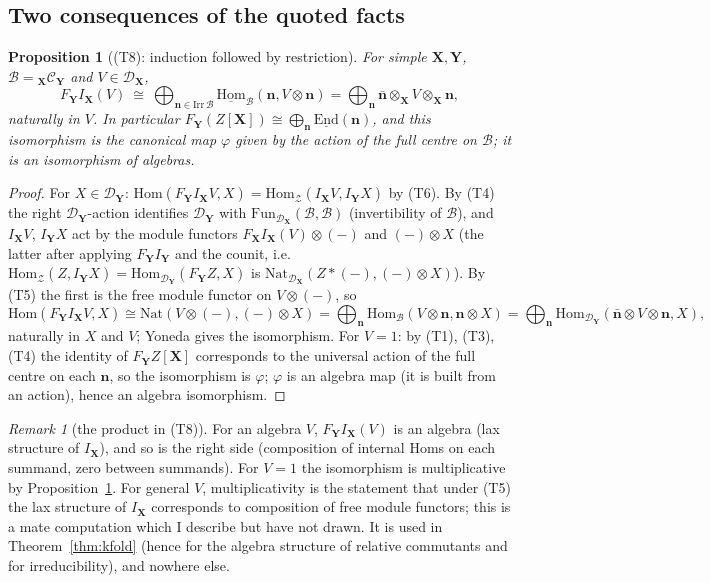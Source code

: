\documentclass[11pt]{article}
\newtheorem{proposition}[theorem]{Proposition}
\theoremstyle{definition}
\theoremstyle{remark}
\newtheorem{remark}[theorem]{Remark}
\begin{document}
\subsection{Two consequences of the quoted facts}
\begin{proposition}[(T8): induction followed by restriction]\label{prop:T8}
For simple $\mathbf X,\mathbf Y$, $\mathcal B={}_{\mathbf X}\mathcal C_{\mathbf Y}$ and $V\in\mathcal D_{\mathbf X}$,
\[
F_{\mathbf Y}I_{\mathbf X}(V)\ \cong\ \bigoplus_{\mathbf n\in\mathrm{Irr}\,\mathcal B}\underline{\mathrm{Hom}}_{\mathcal B}(\mathbf n,V\otimes\mathbf n)=\bigoplus_{\mathbf n}\bar{\mathbf n}\otimes_{\mathbf X}V\otimes_{\mathbf X}\mathbf n,
\]
naturally in $V$. In particular $F_{\mathbf Y}(Z[\mathbf X])\cong\bigoplus_{\mathbf n}\underline{\mathrm{End}}(\mathbf n)$, and this isomorphism is the canonical map $\varphi$ given by the action of the full centre on $\mathcal B$; it is an isomorphism of algebras.
\end{proposition}
\begin{proof}
For $X\in\mathcal D_{\mathbf Y}$: $\mathrm{Hom}(F_{\mathbf Y}I_{\mathbf X}V,X)=\mathrm{Hom}_{\mathcal Z}(I_{\mathbf X}V,I_{\mathbf Y}X)$ by (T6). By (T4) the right $\mathcal D_{\mathbf Y}$-action identifies $\mathcal D_{\mathbf Y}$ with $\mathrm{Fun}_{\mathcal D_{\mathbf X}}(\mathcal B,\mathcal B)$ (invertibility of $\mathcal B$), and $I_{\mathbf X}V$, $I_{\mathbf Y}X$ act by the module functors $F_{\mathbf X}I_{\mathbf X}(V)\otimes(-)$ and $(-)\otimes X$ (the latter after applying $F_{\mathbf Y}I_{\mathbf Y}$ and the counit, i.e.\ $\mathrm{Hom}_{\mathcal Z}(Z,I_{\mathbf Y}X)=\mathrm{Hom}_{\mathcal D_{\mathbf Y}}(F_{\mathbf Y}Z,X)$ is $\mathrm{Nat}_{\mathcal D_{\mathbf X}}(Z\ast(-),(-)\otimes X)$). By (T5) the first is the free module functor on $V\otimes(-)$, so
\[
\mathrm{Hom}(F_{\mathbf Y}I_{\mathbf X}V,X)\cong\mathrm{Nat}(V\otimes(-),(-)\otimes X)=\bigoplus_{\mathbf n}\mathrm{Hom}_{\mathcal B}(V\otimes\mathbf n,\mathbf n\otimes X)=\bigoplus_{\mathbf n}\mathrm{Hom}_{\mathcal D_{\mathbf Y}}(\bar{\mathbf n}\otimes V\otimes\mathbf n,X),
\]
naturally in $X$ and $V$; Yoneda gives the isomorphism. For $V=1$: by (T1), (T3), (T4) the identity of $F_{\mathbf Y}Z[\mathbf X]$ corresponds to the universal action of the full centre on each $\mathbf n$, so the isomorphism is $\varphi$; $\varphi$ is an algebra map (it is built from an action), hence an algebra isomorphism.
\end{proof}

\begin{remark}[the product in (T8)]\label{rem:T8}
For an algebra $V$, $F_{\mathbf Y}I_{\mathbf X}(V)$ is an algebra (lax structure of $I_{\mathbf X}$), and so is the right side (composition of internal Homs on each summand, zero between summands). For $V=1$ the isomorphism is multiplicative by Proposition~\ref{prop:T8}. For general $V$, multiplicativity is the statement that under (T5) the lax structure of $I_{\mathbf X}$ corresponds to composition of free module functors; this is a mate computation which I describe but have not drawn. It is used in Theorem~\ref{thm:kfold} (hence for the algebra structure of relative commutants and for irreducibility), and nowhere else.
\end{remark}
\end{document}

